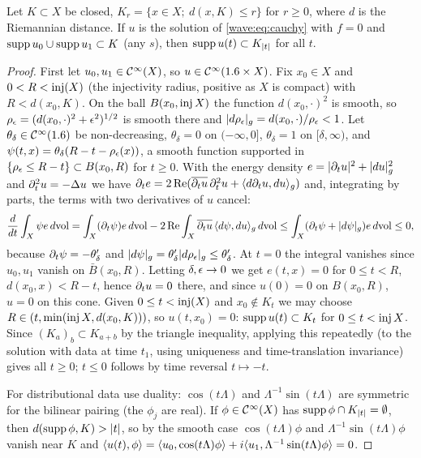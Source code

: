 \begin{theorem}\label{wave:thm:finite-speed}
Let $K\subset X$ be closed, $K_r=\{x\in X;\ d(x,K)\le r\}$ for $r\ge0$, where $d$ is
the Riemannian distance. If $u$ is the solution of \eqref{wave:eq:cauchy} with
$f=0$ and $\operatorname{supp} u_0\cup\operatorname{supp} u_1\subset K$ (any $s$), then
$\operatorname{supp} u(t)\subset K_{|t|}$ for all $t$.
\end{theorem}
\begin{proof}
First let $u_0,u_1\in\mathcal{C}^\infty(X)$, so $u\in\mathcal{C}^\infty(1.6\times X)$. Fix
$x_0\in X$ and $0<R<\operatorname{inj}(X)$ (the injectivity radius, positive as $X$ is compact)
with $R<d(x_0,K)$. On the ball $B(x_0,\operatorname{inj} X)$ the function $d(x_0,\cdot)^2$ is
smooth, so $\rho_\epsilon=(d(x_0,\cdot)^2+\epsilon^2)^{1/2}$ is smooth there and
$|d\rho_\epsilon|_g=d(x_0,\cdot)/\rho_\epsilon<1$. Let $\theta_\delta\in\mathcal{C}^\infty(1.6)$ be
non-decreasing, $\theta_\delta=0$ on $(-\infty,0]$, $\theta_\delta=1$ on
$[\delta,\infty)$, and $\psi(t,x)=\theta_\delta(R-t-\rho_\epsilon(x))$, a smooth
function supported in $\{\rho_\epsilon\le R-t\}\subset B(x_0,R)$ for $t\ge0$. With
the energy density $e=|\partial_tu|^2+|du|_g^2$ and $\partial_t^2u=-\Delta u$ we have
$\partial_te=2\operatorname{Re}(\overline{\partial_tu}\,\partial_t^2u+\langle d\partial_tu,du\rangle_g)$ and, integrating by
parts, the terms with two derivatives of $u$ cancel:
\begin{equation*}
\frac{d}{dt}\int_X\psi e\,d\mathrm{vol}=\int_X(\partial_t\psi)e\,d\mathrm{vol}-2\operatorname{Re}\int_X\overline{\partial_tu}\,\langle d\psi,du\rangle_g\,d\mathrm{vol}
\le\int_X(\partial_t\psi+|d\psi|_g)e\,d\mathrm{vol}\le0,
\end{equation*}
because $\partial_t\psi=-\theta_\delta'$ and $|d\psi|_g=\theta_\delta'|d\rho_\epsilon|_g\le\theta_\delta'$.
At $t=0$ the integral vanishes since $u_0,u_1$ vanish on $\bar B(x_0,R)$.
Letting $\delta,\epsilon\to0$ we get $e(t,x)=0$ for $0\le t<R$,
$d(x_0,x)<R-t$, hence $\partial_tu=0$ there, and since $u(0)=0$ on $B(x_0,R)$,
$u=0$ on this cone. Given $0\le t<\operatorname{inj}(X)$ and $x_0\notin K_t$ we may choose
$R\in(t,\min(\operatorname{inj} X,d(x_0,K)))$, so $u(t,x_0)=0$: $\operatorname{supp} u(t)\subset K_t$ for
$0\le t<\operatorname{inj} X$. Since $(K_a)_b\subset K_{a+b}$ by the triangle inequality,
applying this repeatedly (to the solution with data at time $t_1$, using
uniqueness and time-translation invariance) gives all $t\ge0$; $t\le0$ follows
by time reversal $t\mapsto-t$.

For distributional data use duality: $\cos(t\Lambda)$ and $\Lambda^{-1}\sin(t\Lambda)$
are symmetric for the bilinear pairing (the $\phi_j$ are real). If
$\phi\in\mathcal{C}^\infty(X)$ has $\operatorname{supp}\phi\cap K_{|t|}=\emptyset$, then
$d(\operatorname{supp}\phi,K)>|t|$, so by the smooth case $\cos(t\Lambda)\phi$ and
$\Lambda^{-1}\sin(t\Lambda)\phi$ vanish near $K$ and
$\langle u(t), \phi\rangle=\langle u_0, \cos(t\Lambda)\phi\rangle+i\langle u_1, \Lambda^{-1}\sin(t\Lambda)\phi\rangle=0$.
\end{proof}


